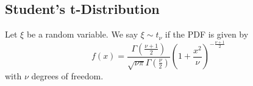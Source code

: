 \subsection{Student's t-Distribution}
Let $\xi$ be a random variable. We say $\xi\sim t_\nu$ if the PDF is given by
\begin{equation}
  f(x)=\frac{\Gamma\left(\frac{\nu+1}{2}\right)}{\sqrt{\nu \pi} \Gamma\left(\frac{\nu}{2}\right)}\left(1+\frac{x^{2}}{\nu}\right)^{-\frac{\nu+1}{2}}
\end{equation}
with $\nu$ degrees of freedom.
